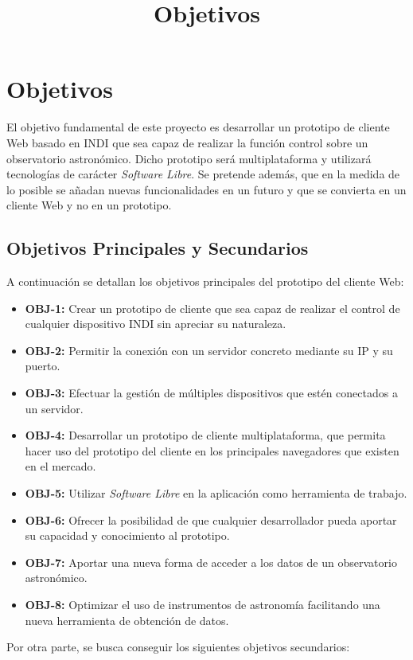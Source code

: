 \chapter{Objetivos}
\title{Objetivos}
\label{cap:Objetivos}

El objetivo fundamental de este proyecto es desarrollar un prototipo de cliente Web basado en INDI que sea capaz de realizar la función control sobre un observatorio astronómico. Dicho prototipo será multiplataforma y utilizará tecnologías de carácter \textit{Software Libre}. Se pretende además, que en la medida de lo posible se añadan nuevas funcionalidades en un futuro y que se convierta en un cliente Web y no en un prototipo.


\section{Objetivos Principales y Secundarios}
A continuación se detallan los objetivos principales del prototipo del cliente Web:

\begin{itemize}
  \item \textbf{OBJ-1:} Crear un prototipo de cliente que sea capaz de realizar el control de cualquier dispositivo INDI sin apreciar su naturaleza.
  \item \textbf{OBJ-2:} Permitir la conexión con un servidor concreto mediante su IP y su puerto.
  \item \textbf{OBJ-3:} Efectuar la gestión de múltiples dispositivos que estén conectados a un servidor.
  \item \textbf{OBJ-4:} Desarrollar un prototipo de cliente multiplataforma, que permita hacer uso del prototipo del cliente en los principales navegadores que existen en el mercado.
  \item \textbf{OBJ-5:} Utilizar \textit{Software Libre} en la aplicación como herramienta de trabajo.
  \item \textbf{OBJ-6:} Ofrecer la posibilidad de que cualquier desarrollador pueda aportar su capacidad y conocimiento al prototipo.
  \item \textbf{OBJ-7:} Aportar una nueva forma de acceder a los datos de un observatorio astronómico.
  \item \textbf{OBJ-8:} Optimizar el uso de instrumentos de astronomía facilitando una nueva herramienta de obtención de datos.
\end{itemize}

Por otra parte, se busca conseguir los siguientes objetivos secundarios:

